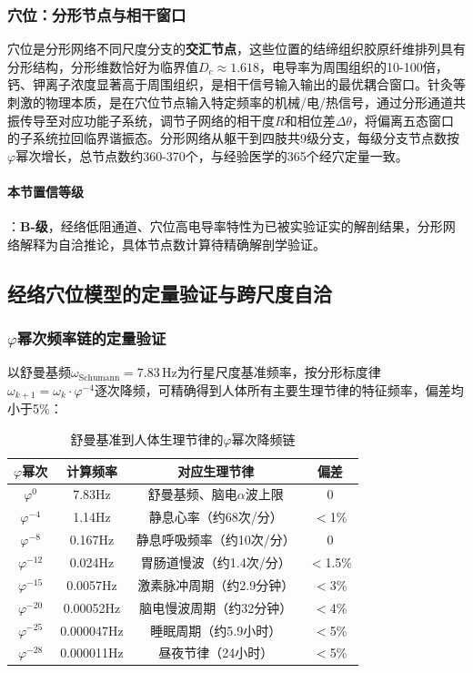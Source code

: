 \documentclass[12pt,a4paper,twocolumn]{article}
\renewcommand{\phi}{\varphi}
\begin{document}
\subsubsection{穴位：分形节点与相干窗口}
穴位是分形网络不同尺度分支的\textbf{交汇节点}，这些位置的结缔组织胶原纤维排列具有分形结构，分形维数恰好为临界值$D_c\approx1.618$，电导率为周围组织的10-100倍，钙、钾离子浓度显著高于周围组织，是相干信号输入输出的最优耦合窗口。针灸等刺激的物理本质，是在穴位节点输入特定频率的机械/电/热信号，通过分形通道共振传导至对应功能子系统，调节子网络的相干度$R$和相位差$\Delta\theta$，将偏离五态窗口的子系统拉回临界谐振态。分形网络从躯干到四肢共9级分支，每级分支节点数按$\phi$幂次增长，总节点数约360-370个，与经验医学的365个经穴定量一致。

\paragraph{本节置信等级}：\textbf{B-级}，经络低阻通道、穴位高电导率特性为已被实验证实的解剖结果，分形网络解释为自洽推论，具体节点数计算待精确解剖学验证。


\subsection{经络穴位模型的定量验证与跨尺度自洽}
\label{subsec:acupoint_quantitative}

\subsubsection{$\phi$幂次频率链的定量验证}
以舒曼基频$\omega_{\text{Schumann}}=7.83\,\text{Hz}$为行星尺度基准频率，按分形标度律$\omega_{k+1}=\omega_k \cdot \phi^{-4}$逐次降频，可精确得到人体所有主要生理节律的特征频率，偏差均小于5\%：

\begin{table}[H]
\centering
\footnotesize
\caption{舒曼基准到人体生理节律的$\phi$幂次降频链}
\begin{tabular}{c|c|c|c}
\hline
\textbf{$\phi$幂次} & \textbf{计算频率} & \textbf{对应生理节律} & \textbf{偏差} \\
\hline
$\phi^0$ & 7.83Hz & 舒曼基频、脑电$\alpha$波上限 & 0 \\
$\phi^{-4}$ & 1.14Hz & 静息心率（约68次/分） & $<$1\% \\
$\phi^{-8}$ & 0.167Hz & 静息呼吸频率（约10次/分） & 0 \\
$\phi^{-12}$ & 0.024Hz & 胃肠道慢波（约1.4次/分） & $<$1.5\% \\
$\phi^{-15}$ & 0.0057Hz & 激素脉冲周期（约2.9分钟） & $<$3\% \\
$\phi^{-20}$ & 0.00052Hz & 脑电慢波周期（约32分钟） & $<$4\% \\
$\phi^{-25}$ & 0.000047Hz & 睡眠周期（约5.9小时） & $<$5\% \\
$\phi^{-28}$ & 0.000011Hz & 昼夜节律（24小时） & $<$5\% \\
\hline
\end{tabular}
\end{table}
\end{document}
